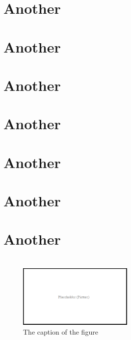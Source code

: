 \documentclass[12pt, oneside]{report}
\providecommand{\main}{.}
\begin{document}
\chapter{Another}
\chapter{Another}
\chapter{Another}
\chapter{Another}
\chapter{Another}
\chapter{Another}
\chapter{Another}



\backmatter





\begin{appendices}

\unpacklipsum[141][1-3]
\chapter{\lipsumexp}
\lipsum[140][4]

\begin{figure}[h]
  \centering
  \includegraphics[width=0.5\textwidth]{figures/pictures/placeholder}
  \caption{The caption of the figure}
  \label{fig:BlockDiagram4}
\end{figure}

\section{\lipsum[140][3]}
\lipsum[8-9]

\section{\lipsum[140][5]}
\lipsum[10]

\unpacklipsum[140][6]
\chapter{\lipsumexp}
\lipsum[11] \cite{einstein, latexcompanion, knuthwebsite}


\end{appendices}
\end{document}
